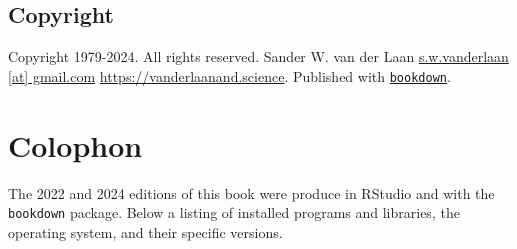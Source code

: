 \documentclass[
]{book}
\newcommand{\passthrough}[1]{#1}
\begin{document}
\hypertarget{copyright-1}{%
\section{Copyright}\label{copyright-1}}

Copyright 1979-2024. All rights reserved. Sander W. van der Laan \textbar{} \href{mailto:s.w.vanderlaan@gmail.com}{s.w.vanderlaan {[}at{]} gmail.com} \textbar{} \url{https://vanderlaanand.science}. Published with \href{https://bookdown.org/yihui/bookdown/}{\passthrough{\lstinline!bookdown!}}.

\hypertarget{colophon}{%
\chapter{Colophon}\label{colophon}}

The 2022 and 2024 editions of this book were produce in RStudio and with the \passthrough{\lstinline!bookdown!} package. Below a listing of installed programs and libraries, the operating system, and their specific versions.
\end{document}

